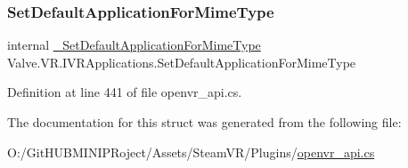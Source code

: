 \subsubsection{\texorpdfstring{SetDefaultApplicationForMimeType}{SetDefaultApplicationForMimeType}}
{\footnotesize\ttfamily internal \mbox{\hyperlink{struct_valve_1_1_v_r_1_1_i_v_r_applications_aa326d8a6ab208fa726df73e9b0fd9351}{\+\_\+\+Set\+Default\+Application\+For\+Mime\+Type}} Valve.\+V\+R.\+I\+V\+R\+Applications.\+Set\+Default\+Application\+For\+Mime\+Type}



Definition at line 441 of file openvr\+\_\+api.\+cs.



The documentation for this struct was generated from the following file\+:\begin{DoxyCompactItemize}
\item 
O\+:/\+Git\+H\+U\+B\+M\+I\+N\+I\+P\+Roject/\+Assets/\+Steam\+V\+R/\+Plugins/\mbox{\hyperlink{openvr__api_8cs}{openvr\+\_\+api.\+cs}}\end{DoxyCompactItemize}
